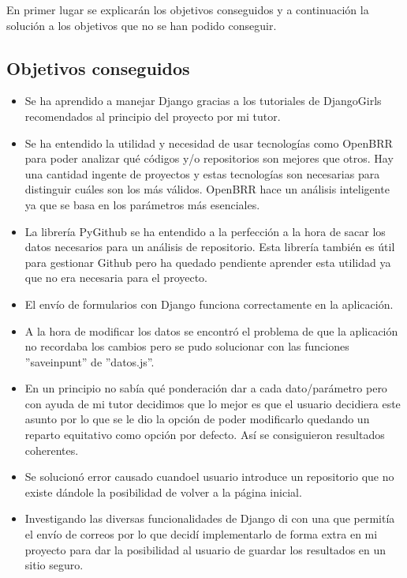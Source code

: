 \documentclass[a4paper, 12pt]{book}
\begin{document}
En primer lugar se explicarán los objetivos conseguidos y a continuación la solución a los objetivos que no se han podido conseguir.

\subsection{Objetivos conseguidos}

\begin{itemize}
	\item Se ha aprendido a manejar Django gracias a los tutoriales de DjangoGirls recomendados al principio del proyecto por mi tutor.
	\item Se ha entendido la utilidad y necesidad de usar tecnologías como OpenBRR para poder analizar qué códigos y/o repositorios son mejores que otros. Hay una cantidad ingente de proyectos y estas tecnologías son necesarias para distinguir cuáles son los más válidos. OpenBRR hace un análisis inteligente ya que se basa en los parámetros más esenciales.
	\item La librería PyGithub se ha entendido a la perfección a la hora de sacar los datos necesarios para un análisis de repositorio. Esta librería también es útil para gestionar Github pero ha quedado pendiente aprender esta utilidad ya que no era necesaria para el proyecto.
	\item El envío de formularios con Django funciona correctamente en la aplicación.
	\item A la hora de modificar los datos se encontró el problema de que la aplicación no recordaba los cambios pero se pudo solucionar con las funciones ''save\textunderscore inpunt'' de ''datos.js''.
	\item En un principio no sabía qué ponderación dar a cada dato/parámetro pero con ayuda de mi tutor decidimos que lo mejor es que el usuario decidiera este asunto por lo que se le dio la opción de poder modificarlo quedando un reparto equitativo como opción por defecto. Así se consiguieron resultados coherentes.
	\item Se solucionó error causado cuandoel usuario introduce un repositorio que no existe dándole la posibilidad de volver a la página inicial.
	\item Investigando las diversas funcionalidades de Django di con una que permitía el envío de correos por lo que decidí implementarlo de forma extra en mi proyecto para dar la posibilidad al usuario de guardar los resultados en un sitio seguro.
\end{itemize}
\end{document}
